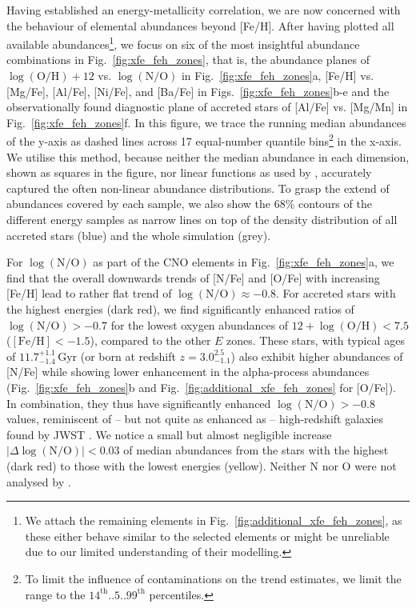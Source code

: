 \documentclass[fleqn,usenatbib]{mnras}
\begin{document}
Having established an energy-metallicity correlation, we are now concerned with the behaviour of elemental abundances beyond [Fe/H]. After having plotted all available abundances\footnote{We attach the remaining elements in Fig.~\ref{fig:additional_xfe_feh_zones}, as these either behave similar to the selected elements or might be unreliable due to our limited understanding of their modelling.}, we focus on six of the most insightful abundance combinations in Fig.~\ref{fig:xfe_feh_zones}, that is, the abundance planes of $\log(\mathrm{O/H}) + 12$ vs. $\log(\mathrm{N/O})$ in Fig.~\ref{fig:xfe_feh_zones}a, [Fe/H] vs. [Mg/Fe], [Al/Fe], [Ni/Fe], and [Ba/Fe] in Figs.~\ref{fig:xfe_feh_zones}b-e and the observationally found diagnostic plane of accreted stars of [Al/Fe] vs. [Mg/Mn] \citep{Hawkins2015, Das2020} in Fig.~\ref{fig:xfe_feh_zones}f. In this figure, we trace the running median abundances of the y-axis as dashed lines across 17 equal-number quantile bins\footnote{To limit the influence of contaminations on the trend estimates, we limit the range to the $14^\mathrm{th}..5..99^\mathrm{th}$ percentiles.} in the x-axis. We utilise this method, because neither the median abundance in each dimension, shown as squares in the figure, nor linear functions as used by \citet{Skuladottir2025}, accurately captured the often non-linear abundance distributions. To grasp the extend of abundances covered by each sample, we also show the 68\% contours of the different energy samples as narrow lines on top of the density distribution of all accreted stars (blue) and the whole simulation (grey).

For $\log(\mathrm{N/O})$ as part of the CNO elements in Fig.~\ref{fig:xfe_feh_zones}a, we find that the overall downwards trends of [N/Fe] and [O/Fe] with increasing [Fe/H] lead to rather flat trend of $\log(\mathrm{N/O}) \approx -0.8$. For accreted stars with the highest energies (dark red), we find significantly enhanced ratios of $\log(\mathrm{N/O}) > -0.7$ for the lowest oxygen abundances of $12 + \log(\mathrm{O/H}) < 7.5$ ($\mathrm{[Fe/H]} < -1.5$), compared to the other $E$ zones. These stars, with typical ages of $11.7_{-1.4}^{+1.1}\,\mathrm{Gyr}$ (or born at redshift $z = 3.0_{-1.1}^{2.5}$) also exhibit higher abundances of [N/Fe] while showing lower enhancement in the alpha-process abundances (Fig.~\ref{fig:xfe_feh_zones}b and Fig.~\ref{fig:additional_xfe_feh_zones} for [O/Fe]). In combination, they thus have significantly enhanced $\log(\mathrm{N/O}) > -0.8$ values, reminiscent of -- but not quite as enhanced as -- high-redshift galaxies found by JWST \citep{Cameron2023, Senchyna2024, Ji2025}. We notice a small but almost negligible increase $\vert\Delta\log(\mathrm{N/O})\vert < 0.03$ of median abundances from the stars with the highest (dark red) to those with the lowest energies (yellow). Neither N nor O were not analysed by \citet{Skuladottir2025}.
\end{document}

